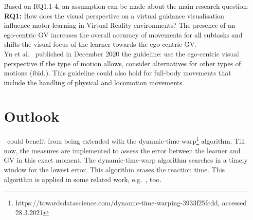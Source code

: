 Based on RQ1.1-4, an assumption can be made about the main research question:\\
\textbf{RQ1:} How does the visual perspective on a virtual guidance visualisation influence motor learning in Virtual Reality environments?
The presence of an ego-centric GV increases the overall accuracy of movements for all subtasks and shifts the visual focus of the learner towards the ego-centric GV.\\

Yu et al.~\cite{perspectivematters} published in December 2020 the guideline: use the ego-centric visual perspective if the type of motion allows, consider alternatives for other types of motions (ibid.). This guideline could also hold for full-body movements that include the handling of physical and locomotion movements.

\section{Outlook}
\label{sec:outlook}
\exgo\ could benefit from being extended with the dynamic-time-warp\footnote{https://towardsdatascience.com/dynamic-time-warping-3933f25fcdd, accessed 28.3.2021} algorithm. Till now, the measures are implemented to assess the error between the learner and GV in this exact moment. The dynamic-time-warp algorithm searches in a timely window for the lowest error. This algorithm erases the reaction time. This algorithm is applied in some related work, e.g.~\cite{thaichichua}, too.\\

